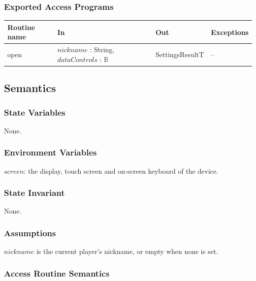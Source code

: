 \documentclass[10pt, titlepage]{article}
\newcommand{\B}{\mathbb{B}}
\newcommand{\T}[1]{\mathit{#1}}          %
\newenvironment{accessprogs}{%
  \begin{center}\small
  \begin{tabular}{>{\raggedright\arraybackslash}p{3.0cm}
    >{\raggedright\arraybackslash}p{5.0cm}
    >{\raggedright\arraybackslash}p{2.8cm}
    >{\raggedright\arraybackslash}p{3.4cm}}
  \toprule
  \textbf{Routine name} & \textbf{In} & \textbf{Out} & \textbf{Exceptions}\\
  \midrule}{%
  \bottomrule
  \end{tabular}
  \end{center}}
\begin{document}
\subsubsection{Exported Access Programs}

\begin{accessprogs}
open & $\T{nickname}$ : String, $\T{dataControls}$ : $\B$ & SettingsResultT & --\\
\end{accessprogs}

\subsection{Semantics}

\subsubsection{State Variables}

None.

\subsubsection{Environment Variables}

$\T{screen}$: the display, touch screen and on-screen keyboard of the device.

\subsubsection{State Invariant}

None.

\subsubsection{Assumptions}

$\T{nickname}$ is the current player's nickname, or empty when none is set.

\subsubsection{Access Routine Semantics}
\end{document}
